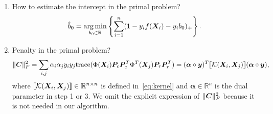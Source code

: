 \documentclass[11pt]{article}
\theoremstyle{plain}
\newtheorem{lem}{Lemma}
\theoremstyle{definition}
\begin{document}
\begin{enumerate}
\begin{lem}
Let $(\mB^*_1, \mB^*_2)$ be the optimal solution to the following problem
\begin{align}\label{eq:optimization}
\min_{\text{rank}(\mB_1)\leq r,\ \text{rank}(\mB_2)\leq r}\ & f(\mB_1+\mB_2)+c(\FnormSize{}{\mB_1}^2+\FnormSize{}{\mB_2}^2).
\end{align}
Then, we must have $\mB^*_1=\mB^*_2$. 
\begin{proof}
Define a new solution $(\tilde \mB^*_1, \tilde\mB^*_2)=({\mB^*_1+\mB^*_2 \over 2}, {\mB^*_1+\mB^*_2\over 2})$. Note that $\text{rank}(\mB^*_1)=\text{rank}(\mB^*_1)\leq 2r$. Therefore
\[
f(\mB^*_1+\mB^*_2)+c(\FnormSize{}{\mB^*_1}^2+\FnormSize{}{\mB^*_2}^2) \leq f(\mB_1+\mB_2)+c(\FnormSize{}{\mB_1}^2+\FnormSize{}{\mB_2}^2).
\]
\[
f(\mB_1+\mB_2)+ {c\over 2}\FnormSize{}{\mB_1+\mB_2}^2\leq f(\mB_1+\mB_2)+c(\FnormSize{}{\mB_1}^2+\FnormSize{}{\mB_2}^2).
\]
\[
\FnormSize{}{\mB_1+\mB_2}^2 \leq 2(\FnormSize{}{\mB_1}^2+\FnormSize{}{\mB_2}^2).
\]
\end{proof}
\begin{align}\label{eq:optimization}
\min_{\text{rank}(\mB_1+\mB_2)\leq r}\ & f(\mB_1+\mB_2)+c(\FnormSize{}{\mB_1}^2+\FnormSize{}{\mB_2}^2).
\end{align}

The optimal solution to~\eqref{eq:optimization} must satisfy $\mB^{*}_1=\mB^{*}_2$.
\end{lem}


\item How to estimate the intercept in the primal problem?
\[
\hat b_0=\operatorname*{arg\,min}_{b_0\in\mathbb{R}}\left\{\sum_{i=1}^n(1-y_if(\bm X_i)-y_ib_0)_{+}\right\}.
\]

\item Penalty in the primal problem?
\[
\lVert\bm C\rVert_F^2=\sum_{i,j}\alpha_i\alpha_jy_iy_j\text{trace}(\Phi(\bm X_i)\bm{P}_c\bm{P}^T_c\Phi^T(\bm X_j)\bm{P}_r\bm{P}^T_r) = 
(\boldsymbol{\alpha}\circ \bm{y})^T\llbracket \mathcal{K}(\bm X_i,\bm X_j) \rrbracket(\boldsymbol{\alpha}\circ \bm{y}),
\]
where $\llbracket \mathcal{K}(\bm X_i,\bm X_j) \rrbracket\in\mathbb{R}^{n\times n}$ is defined in~\eqref{eq:kernel} and $\boldsymbol{\alpha}\in\mathbb{R}^n$ is the dual parameter in step 1 or 3. We omit the explicit expression of $\lVert\bm C\rVert_F^2$ because it is not needed in our algorithm. 

\end{enumerate}
\end{document}
